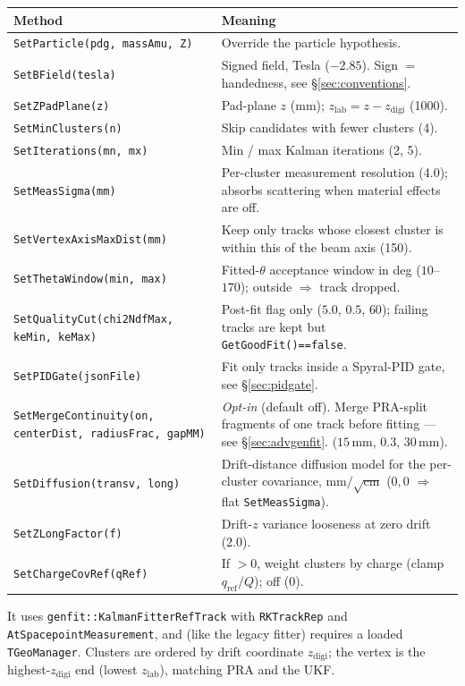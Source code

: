 \documentclass[11pt,a4paper]{article}
\newcommand{\code}[1]{\texttt{\small #1}}
\begin{document}
\begin{longtable}{@{}p{6.6cm} p{7.8cm}@{}}
\toprule
\textbf{Method} & \textbf{Meaning} \\
\midrule
\endhead
\code{SetParticle(pdg, massAmu, Z)}     & Override the particle hypothesis. \\
\code{SetBField(tesla)}                 & Signed field, Tesla ($-2.85$). Sign $=$ handedness, see \S\ref{sec:conventions}. \\
\code{SetZPadPlane(z)}                  & Pad-plane $z$ (mm); $z_\mathrm{lab}=z-z_\mathrm{digi}$ (1000). \\
\code{SetMinClusters(n)}                & Skip candidates with fewer clusters (4). \\
\code{SetIterations(mn, mx)}            & Min / max Kalman iterations (2, 5). \\
\code{SetMeasSigma(mm)}                 & Per-cluster measurement resolution (4.0); absorbs scattering when material effects are off. \\
\code{SetVertexAxisMaxDist(mm)}         & Keep only tracks whose closest cluster is within this of the beam axis (150). \\
\code{SetThetaWindow(min, max)}         & Fitted-$\theta$ acceptance window in deg ($10$--$170$); outside $\Rightarrow$ track dropped. \\
\code{SetQualityCut(chi2NdfMax, keMin, keMax)} & Post-fit flag only ($5.0$, $0.5$, $60$); failing tracks are kept but \code{GetGoodFit()==false}. \\
\code{SetPIDGate(jsonFile)}             & Fit only tracks inside a Spyral-PID gate, see \S\ref{sec:pidgate}. \\
\code{SetMergeContinuity(on, centerDist, radiusFrac, gapMM)} & \emph{Opt-in} (default off). Merge PRA-split fragments of one track before fitting --- see \S\ref{sec:advgenfit}. ($15$\,mm, $0.3$, $30$\,mm). \\
\code{SetDiffusion(transv, long)}       & Drift-distance diffusion model for the per-cluster covariance, mm$/\sqrt{\mathrm{cm}}$ ($0,0$ $\Rightarrow$ flat \code{SetMeasSigma}). \\
\code{SetZLongFactor(f)}                & Drift-$z$ variance looseness at zero drift (2.0). \\
\code{SetChargeCovRef(qRef)}            & If $>0$, weight clusters by charge (clamp $q_\mathrm{ref}/Q$); off (0). \\
\bottomrule
\end{longtable}

It uses \code{genfit::KalmanFitterRefTrack} with \code{RKTrackRep} and
\code{AtSpacepointMeasurement}, and (like the legacy fitter) requires a loaded
\code{TGeoManager}. Clusters are ordered by drift coordinate $z_\mathrm{digi}$;
the vertex is the highest-$z_\mathrm{digi}$ end (lowest $z_\mathrm{lab}$), matching
PRA and the UKF.
\end{document}
